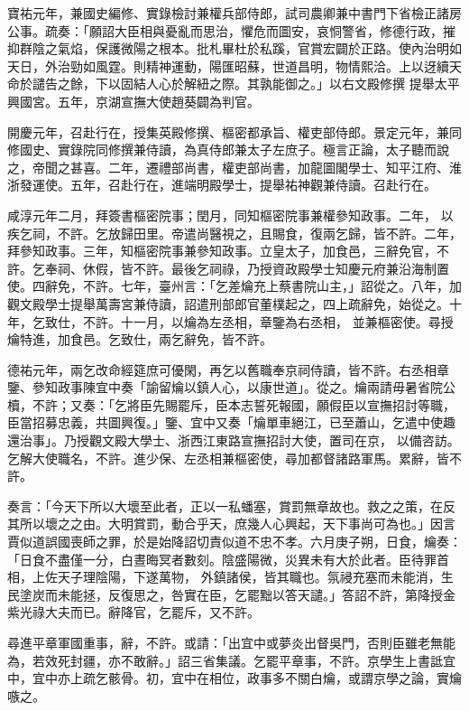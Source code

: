 \begin{pinyinscope}
 寶祐元年，兼國史編修、實錄檢討兼權兵部侍郎，試司農卿兼中書門下省檢正諸房公事。疏奏：「願詔大臣相與憂亂而思治，懼危而圖安，哀恫警省，修德行政，摧抑群陰之氣焰，保護微陽之根本。批札畢杜於私蹊，官賞宏闢於正路。使內治明如天日，外治勁如風霆。則精神運動，陽匯昭蘇，世道昌明，物情熙洽。上以迓續天命於譴告之餘，下以固結人心於解紐之際。其孰能御之。」以右文殿修撰
 提舉太平興國宮。五年，京湖宣撫大使趙葵闢為判官。



 開慶元年，召赴行在，授集英殿修撰、樞密都承旨、權吏部侍郎。景定元年，兼同修國史、實錄院同修撰兼侍讀，為真侍郎兼太子左庶子。極言正論，太子聽而說之，帝聞之甚喜。二年，遷禮部尚書，權吏部尚書，加龍圖閣學士、知平江府、淮浙發運使。五年，召赴行在，進端明殿學士，提舉祐神觀兼侍讀。召赴行在。



 咸淳元年二月，拜簽書樞密院事；閏月，同知樞密院事兼權參知政事。二年，
 以疾乞祠，不許。乞放歸田里。帝遣尚醫視之，且賜食，復兩乞歸，皆不許。二年，拜參知政事。三年，知樞密院事兼參知政事。立皇太子，加食邑，三辭免官，不許。乞奉祠、休假，皆不許。最後乞祠祿，乃授資政殿學士知慶元府兼沿海制置使。四辭免，不許。七年，臺州言：「乞差爚充上蔡書院山主，」詔從之。八年，加觀文殿學士提舉萬壽宮兼侍讀，詔遣刑部郎官董樸起之，四上疏辭免，始從之。十年，乞致仕，不許。十一月，以爚為左丞相，章鑒為右丞相，
 並兼樞密使。尋授爚特進，加食邑。乞致仕，兩乞辭免，皆不許。



 德祐元年，兩乞改命經筵庶可優閑，再乞以舊職奉京祠侍讀，皆不許。右丞相章鑒、參知政事陳宜中奏「諭留爚以鎮人心，以康世道」。從之。爚兩請毋暑省院公櫝，不許；又奏：「乞將臣先賜罷斥，臣本志誓死報國，願假臣以宣撫招討等職，臣當招募忠義，共圖興復。」鑒、宜中又奏「爚單車絕江，已至蕭山，乞遣中使趣還治事」。乃授觀文殿大學士、浙西江東路宣撫招討大使，置司在京，
 以備咨訪。乞解大使職名，不許。進少保、左丞相兼樞密使，尋加都督諸路軍馬。累辭，皆不許。



 奏言：「今天下所以大壞至此者，正以一私蟠塞，賞罰無章故也。救之之策，在反其所以壞之之由。大明賞罰，動合乎天，庶幾人心興起，天下事尚可為也。」因言賈似道誤國喪師之罪，於是始降詔切責似道不忠不孝。六月庚子朔，日食，爚奏：「日食不盡僅一分，白晝晦冥者數刻。陰盛陽微，災異未有大於此者。臣待罪首相，上佐天子理陰陽，下遂萬物，
 外鎮諸侯，皆其職也。氛祲充塞而未能消，生民塗炭而未能拯，反復思之，咎實在臣，乞罷黜以答天譴。」答詔不許，第降授金紫光祿大夫而已。辭降官，乞罷斥，又不許。



 尋進平章軍國重事，辭，不許。或請：「出宜中或夢炎出督吳門，否則臣雖老無能為，若效死封疆，亦不敢辭。」詔三省集議。乞罷平章事，不許。京學生上書詆宜中，宜中亦上疏乞骸骨。初，宜中在相位，政事多不關白爚，或謂京學之論，實爚嗾之。




\end{pinyinscope}
